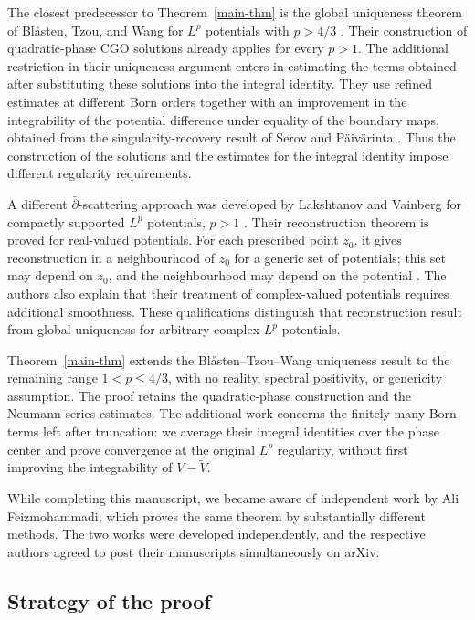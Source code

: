 \documentclass[a4paper,11pt]{article}
\theoremstyle{plain}
\theoremstyle{definition}
\theoremstyle{remark}
\begin{document}
The closest predecessor to Theorem~\ref{main-thm} is the global uniqueness theorem of Bl\r{a}sten, Tzou, and Wang for $L^p$ potentials with $p>4/3$ \cite{BlastenTzouWang2020}. Their construction of quadratic-phase CGO solutions already applies for every $p>1$. The additional restriction in their uniqueness argument enters in estimating the terms obtained after substituting these solutions into the integral identity. They use refined estimates at different Born orders together with an improvement in the integrability of the potential difference under equality of the boundary maps, obtained from the singularity-recovery result of Serov and P\"aiv\"arinta \cite{SerovPaivarinta2005}. Thus the construction of the solutions and the estimates for the integral identity impose different regularity requirements.

A different $\bar\partial$-scattering approach was developed by Lakshtanov and Vainberg for compactly supported $L^p$ potentials, $p>1$ \cite{LakshtanovVainberg2017}. Their reconstruction theorem is proved for real-valued potentials. For each prescribed point $z_0$, it gives reconstruction in a neighbourhood of $z_0$ for a generic set of potentials; this set may depend on $z_0$, and the neighbourhood may depend on the potential \cite[Theorem~2.3 and the following remark]{LakshtanovVainberg2017}. The authors also explain that their treatment of complex-valued potentials requires additional smoothness. These qualifications distinguish that reconstruction result from global uniqueness for arbitrary complex $L^p$ potentials.

Theorem~\ref{main-thm} extends the Bl\r{a}sten--Tzou--Wang uniqueness result to the remaining range $1<p\leq4/3$, with no reality, spectral positivity, or genericity assumption. The proof retains the quadratic-phase construction and the Neumann-series estimates. The additional work concerns the finitely many Born terms left after truncation: we average their integral identities over the phase center and prove convergence at the original $L^p$ regularity, without first improving the integrability of $V-\widetilde V$.

While completing this manuscript, we became aware of independent work by Ali Feizmohammadi, which proves the same theorem by substantially different methods. The two works were developed independently, and the respective authors agreed to post their manuscripts simultaneously on arXiv.

\subsection{Strategy of the proof}
\end{document}
